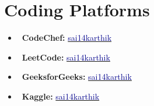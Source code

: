 \documentclass[a4paper,11pt]{article}
\newcommand{\socialicon}[1]{\raisebox{-0.05em}{\resizebox{!}{1em}{#1}}}
\begin{document}
\section{\textbf{Coding Platforms}}
\vspace{-0.2mm}
\small{
\begin{itemize}[leftmargin=*,labelsep=2mm]
  \item \faCode \ \textbf{CodeChef:} \href{https://www.codechef.com/users/sai14karthik}{\textcolor{darkblue}{sai14karthik}}
  \item \faLaptopCode \ \textbf{LeetCode:} \href{https://leetcode.com/sai14karthik}{\textcolor{darkblue}{sai14karthik}}
  \item \faBrain \ \textbf{GeeksforGeeks:} \href{https://auth.geeksforgeeks.org/user/sai14karthik}{\textcolor{darkblue}{sai14karthik}}
  \item \socialicon{\faKaggle} \ \textbf{Kaggle:} \href{https://www.kaggle.com/sai14karthik}{\textcolor{darkblue}{sai14karthik}}
\end{itemize}
}
\end{document}
